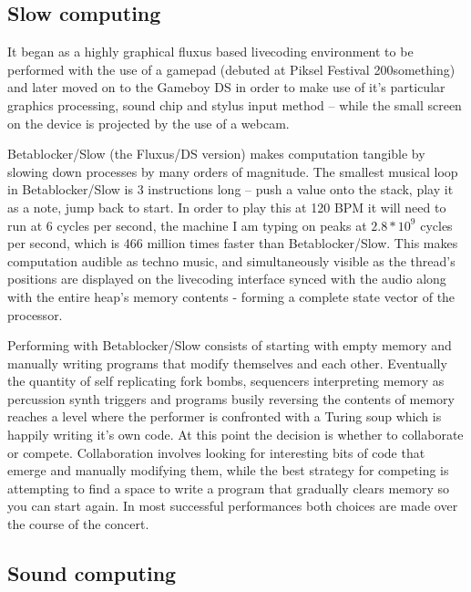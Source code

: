 \documentclass[letterpaper, 12pt]{article}
\begin{document}
\subsection*{Slow computing} %
\label{sub:slow_computing}
It began as a highly graphical fluxus based livecoding environment to be performed with the use of a gamepad (debuted at Piksel Festival 200something) and later moved on to the Gameboy DS in order to make use of it's particular graphics processing, sound chip and stylus input method -- while the small screen on the device is projected by the use of a webcam.


Betablocker/Slow (the Fluxus/DS version) makes computation tangible by slowing down processes by many orders of magnitude. 
The smallest musical loop in Betablocker/Slow is 3 instructions long -- push a value onto the stack, play it as a note, jump back to start. 
In order to play this at 120 BPM it will need to run at 6 cycles per second, the machine I am typing on peaks at $2.8*10^9$ cycles per second, which is 466 million times faster than Betablocker/Slow. This makes computation audible as techno music, and simultaneously visible as the thread's positions are displayed on the livecoding interface synced with the audio along with the entire heap's memory contents - forming a complete state vector of the processor.

Performing with Betablocker/Slow consists of starting with empty memory and manually writing programs that modify themselves and each other.
Eventually the quantity of self replicating fork bombs, sequencers interpreting memory as percussion synth triggers and programs busily reversing the contents of memory reaches a level where the performer is confronted with a Turing soup which is happily writing it's own code. 
At this point the decision is whether to collaborate or compete.
Collaboration involves looking for interesting bits of code that emerge and manually modifying them, while the best strategy for competing is attempting to find a space to write a program that gradually clears memory so you can start again. 
In most successful performances both choices are made over the course of the concert.




\subsection*{Sound computing} %
\label{sub:sound_computing}
\end{document}

